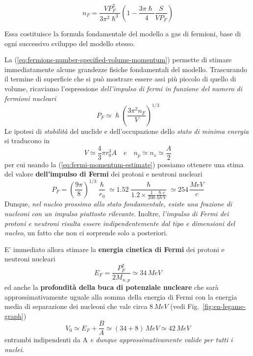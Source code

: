 \begin{equation}
	n_{F} = \frac{V P_{F}^{3}}{3 \pi^{2}\hslash^{3}} \left( 1 - \frac{3\pi \hslash}{4} \frac{S}{VP_{F}} \right)
	\label{eq:fermions-number-specified-volume-momentum}
\end{equation}

Essa costituisce la formula fondamentale del modello a gas di fermioni, base di ogni successivo sviluppo del modello stesso.
\bigskip

La (\ref{eq:fermions-number-specified-volume-momentum}) permette di stimare immediatamente alcune grandezze fisiche fondamentali del modello.
Trascurando il termine di superficie che si può mostrare essere assi più piccolo di quello di volume, ricaviamo
l’espressione \emph{dell’impulso di fermi in funzione del numero di fermioni nucleari}
\begin{equation}
	P_{F} \simeq \hslash \left(\frac{3\pi^{2}n_{F}}{V} \right)^{1/3}
	\label{eq:fermi-momentum-estimate}
\end{equation}
Le ipotesi di \emph{stabilità} del nuclide e dell'occupazione dello \emph{stato di minima energia} si traducono in
\[
	V \simeq \frac{4}{3}\pi r_{0}^{3}A \quad e \quad n_{p}\simeq n_{s} \simeq \frac{A}{2}
\]
per cui usando la (\ref{eq:fermi-momentum-estimate}) possiamo ottenere una stima del valore \textbf{dell’impulso di Fermi} dei protoni e neutroni nucleari
\[
P_{F} = \left( \frac{9\pi}{8} \right)^{1/3} \frac{\hslash}{r_{0}} \simeq 1.52 \frac{\hslash}{1.2 \times \frac{1}{200}\frac{\hslash c}{MeV}} \simeq 254 \, \frac{MeV}{c}
\]
Dunque, \emph{nel nucleo prossimo allo stato fondamentale, esiste una frazione di nucleoni con un impulso piuttosto rilevante}. Inoltre, \emph{l’impulso di Fermi dei protoni e neutroni risulta essere indipendentemente dal tipo e dimensioni del nucleo}, un fatto che non ci sorprende solo a posteriori.
\bigskip

E’ immediato allora stimare la \textbf{energia cinetica di Fermi} dei protoni e neutroni nucleari
\begin{equation}
	E_{F} = \frac{P_{F}^{2}}{2M_{n,p}} \simeq 34 \, MeV
	\label{eq:fermi-kinetic-energy-estimate}
\end{equation}
ed anche la \textbf{profondità della buca di potenziale nucleare} che sarà approssimativamente uguale alla somma della energia di Fermi con la energia media di separazione dei nucleoni che vale circa $8 \, MeV$
(vedi Fig.~\ref{fig:en-legame-graph})
\begin{equation}
	V_{0} \simeq E_{F} + \frac{B}{A} \simeq (34 + 8)\, MeV \simeq 42 \, MeV
   \label{eq:potential-well-fermion-gas-estimate}
\end{equation}
entrambi indipendenti da A \emph{e dunque approssimativamente valide per tutti i nuclei}.

